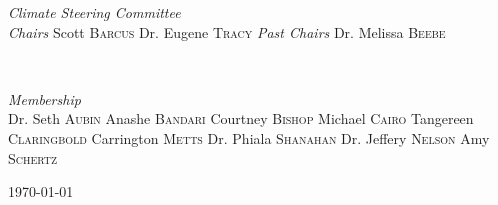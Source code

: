\documentclass[oneside]{book}   %
\begin{document}
\begin{titlepage}
	\begin{minipage}{0.5\textwidth}
		\begin{flushleft}
			\large
			\textit{Climate Steering Committee}\\
			\textit{Chairs} \newline%
			Scott \textsc{Barcus} \newline
			Dr. Eugene \textsc{Tracy} \newline
			\textit{Past Chairs} \newline
			Dr. Melissa \textsc{Beebe}
		\end{flushleft}
	\end{minipage}
	~
	\begin{minipage}{0.4\textwidth}
		\begin{flushleft}
			\large
			\textit{Membership}\\
			Dr. Seth \textsc{Aubin} \newline%
			Anashe \textsc{Bandari} \newline
			Courtney \textsc{Bishop} \newline
			Michael \textsc{Cairo} \newline
			Tangereen \textsc{Claringbold} \newline
			Carrington \textsc{Metts} \newline
			Dr. Phiala \textsc{Shanahan} \newline
			Dr. Jeffery \textsc{Nelson} \newline
			Amy \textsc{Schertz}
			
					
		\end{flushleft}
	\end{minipage}
	
	
	
	\vfill\vfill\vfill %
	
	{\large\today} %
	
	
	 
	
	\vfill %
	
\end{titlepage}
\end{document}
